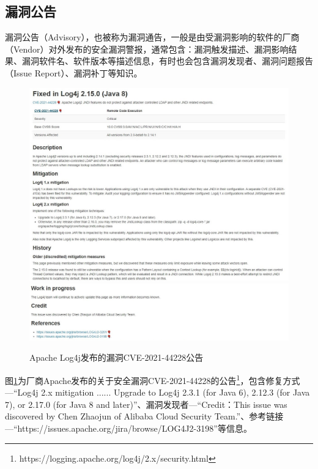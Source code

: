 \subsection{漏洞公告} 
漏洞公告（Advisory），也被称为漏洞通告，一般是由受漏洞影响的软件的厂商（Vendor）对外发布的安全漏洞警报，通常包含：漏洞触发描述、漏洞影响结果、漏洞软件名、软件版本等描述信息，有时也会包含漏洞发现者、漏洞问题报告（Issue Report）、漏洞补丁等知识。

\begin{figure}[!t]
    \centering
    \includegraphics[width=1.0\textwidth]{fig/Vendor-2021-44228}
    \includegraphics[width=1.0\textwidth]{fig/Vendor-2021-44228-2}
    \caption{Apache Log4j发布的漏洞CVE-2021-44228公告}
    \label{fig:Vendor-2021-44228}
\end{figure}

图\ref{fig:Vendor-2021-44228}为厂商Apache发布的关于安全漏洞CVE-2021-44228的公告\footnote{https://logging.apache.org/log4j/2.x/security.html}，包含修复方式---“Log4j 2.x mitigation ...... Upgrade to Log4j 2.3.1 (for Java 6), 2.12.3 (for Java 7), or 2.17.0 (for Java 8 and later)”、漏洞发现者---“Credit：This issue was discovered by Chen Zhaojun of Alibaba Cloud Security Team.”、参考链接---“https://issues.apache.org/jira/browse/LOG4J2-3198”等信息。



